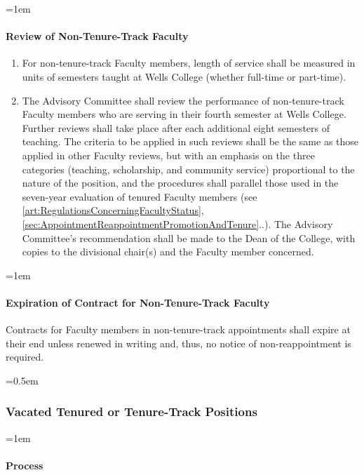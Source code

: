 \documentclass{manual}
\let\oldsubsubsection\subsubsection
\renewcommand\subsubsection{\leftskip=0.5em\oldsubsubsection}
\let\oldparagraph\paragraph
\renewcommand\paragraph{\leftskip=1em\oldparagraph}
\newcommand{\itemLevelA}{\alph*.}
\newcommand{\itemRefA}{\alph*}
\begin{document}
\paragraph{Review of Non-Tenure-Track Faculty}\label{par:ReviewOfPartTimeVisitingAndOtherNonTenureTrackOfficersOfInstruction}
\begin{enumerate}[label=\itemLevelA,ref=\itemRefA]
\item For non-tenure-track Faculty members, length of service shall be measured in units of semesters taught at Wells College (whether full-time or part-time).

\item The Advisory Committee shall review the performance of non-tenure-track Faculty members who are serving in their fourth semester at Wells College. Further reviews shall take place after each additional eight semesters of teaching. The criteria to be applied in such reviews shall be the same as those applied in other Faculty reviews, but with an emphasis on the three categories (teaching, scholarship, and community service) proportional to the nature of the position, and the procedures shall parallel those used in the seven-year evaluation of tenured Faculty members (see \cref{art:RegulationsConcerningFacultyStatus}, \cref{sec:AppointmentReappointmentPromotionAndTenure}..). The Advisory Committee's recommendation shall be made to the Dean of the College, with copies to the divisional chair(s) and the Faculty member concerned.
\end{enumerate}

\paragraph{Expiration of Contract for Non-Tenure-Track Faculty}
Contracts for Faculty members in non-tenure-track appointments shall expire at their end unless renewed in writing and, thus, no notice of non-reappointment is required.



\subsubsection{Vacated Tenured or Tenure-Track Positions}

\paragraph{Process}
\end{document}
